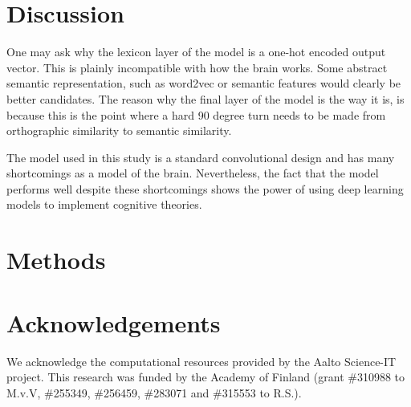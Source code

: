 \documentclass[a4paper, 10pt]{vanvliet_paper}
\begin{document}
\section{Discussion}
One may ask why the lexicon layer of the model is a one-hot encoded output vector.
This is plainly incompatible with how the brain works.
Some abstract semantic representation, such as word2vec or semantic features would clearly be better candidates.
The reason why the final layer of the model is the way it is, is because this is the point where a hard 90 degree turn needs to be made from orthographic similarity to semantic similarity.

The model used in this study is a standard convolutional design and has many shortcomings as a model of the brain.
Nevertheless, the fact that the model performs well despite these shortcomings shows the power of using deep learning models to implement cognitive theories.

\section{Methods}
\section{Acknowledgements}
We acknowledge the computational resources provided by the Aalto Science-IT project.
This research was funded by the Academy of Finland (grant \#310988 to M.v.V, \#255349, \#256459, \#283071 and \#315553 to R.S.).

\newpage
\printbibliography{}
\end{document}
